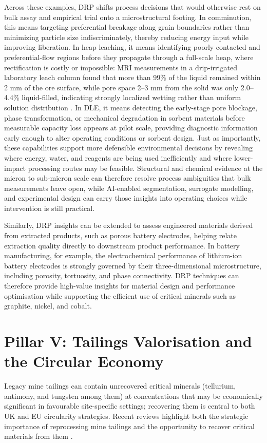 \documentclass[12pt,a4paper]{article}
\begin{document}
Across these examples, DRP shifts process decisions that would otherwise rest on bulk assay and empirical trial onto a microstructural footing. In comminution, this means targeting preferential breakage along grain boundaries rather than minimizing particle size indiscriminately, thereby reducing energy input while improving liberation. In heap leaching, it means identifying poorly contacted and preferential-flow regions before they propagate through a full-scale heap, where rectification is costly or impossible: MRI measurements in a drip-irrigated laboratory leach column found that more than 99\% of the liquid remained within 2 mm of the ore surface, while pore space 2--3 mm from the solid was only 2.0--4.4\% liquid-filled, indicating strongly localized wetting rather than uniform solution distribution \cite{mri_heap_leach_2015}. In DLE, it means detecting the early-stage pore blockage, phase transformation, or mechanical degradation in sorbent materials before measurable capacity loss appears at pilot scale, providing diagnostic information early enough to alter operating conditions or sorbent design. Just as importantly, these capabilities support more defensible environmental decisions by revealing where energy, water, and reagents are being used inefficiently and where lower-impact processing routes may be feasible. Structural and chemical evidence at the micron to sub-micron scale can therefore resolve process ambiguities that bulk measurements leave open, while AI-enabled segmentation, surrogate modelling, and experimental design can carry those insights into operating choices while intervention is still practical.

Similarly, DRP insights can be extended to assess engineered materials derived from extracted products, such as porous battery electrodes, helping relate extraction quality directly to downstream product performance. In battery manufacturing, for example, the electrochemical performance of lithium-ion battery electrodes is strongly governed by their three-dimensional microstructure, including porosity, tortuosity, and phase connectivity. DRP techniques can therefore provide high-value insights for material design and performance optimisation while supporting the efficient use of critical minerals such as graphite, nickel, and cobalt.

\section{Pillar V: Tailings Valorisation and the Circular Economy}
Legacy mine tailings can contain unrecovered critical minerals (tellurium, antimony, and tungsten among them) at concentrations that may be economically significant in favourable site-specific settings; recovering them is central to both UK and EU circularity strategies. Recent reviews highlight both the strategic importance of reprocessing mine tailings and the opportunity to recover critical materials from them \cite{sarker_tailings_2022, araya_tailings_2020, nwaila_minewaste_2021}. 
\end{document}
